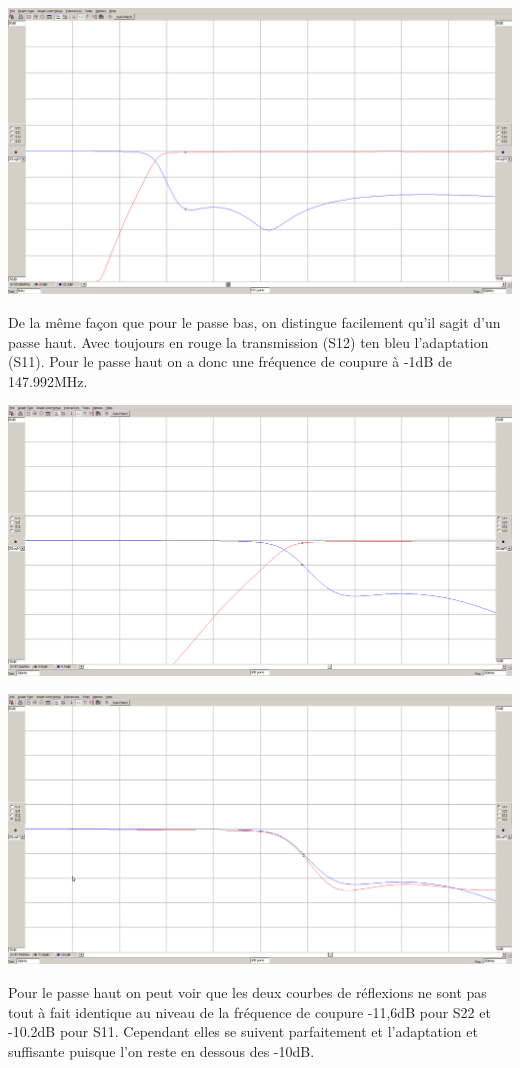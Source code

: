 \documentclass[a4paper,12pt]{report}            %
\begin{document}
\begin{center}\includegraphics[scale = 0.25]{pic/parametre_passe_haut.png}\\ \end{center}
De la même façon que pour le passe bas, on distingue facilement qu'il sagit d'un passe haut.
Avec toujours en rouge la transmission (S12) ten bleu l'adaptation (S11). Pour le passe haut 
on a donc une fréquence de coupure à -1dB de 147.992MHz.
\begin{center}\includegraphics[scale = 0.25]{pic/freq_coupure_ph.png}\\ \end{center}

\begin{center}\includegraphics[scale = 0.25]{pic/reflexion_ph.png}\\ \end{center}
Pour le passe haut on peut voir que les deux courbes de réflexions ne sont pas tout à fait 
identique au niveau de la fréquence de coupure -11,6dB pour S22 et -10.2dB pour S11. Cependant 
elles se suivent parfaitement et l'adaptation et suffisante puisque l'on reste en dessous des -10dB.
\end{document}

